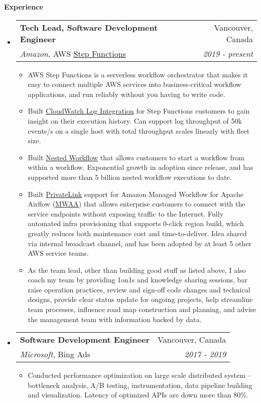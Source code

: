 \documentclass[letterpaper,10pt]{article}
\makeatletter
\newcommand{\resitem}[1]{\item #1 \vspace{-2pt}}
\newcommand{\resheading}[1]{{\large \colorbox{mygrey}{\begin{minipage}{\textwidth}{\textbf{#1 \vphantom{p\^{E}}}}\end{minipage}}}}
\newcommand{\ressubheading}[4]{
\begin{tabular*}{7.0in}{l@{\extracolsep{\fill}}r}
    \textbf{#1} & #2 \\
    #3 & \textit{#4} \\
\end{tabular*}\vspace{-6pt}}
\makeatother
\begin{document}
\resheading{Experience}
\begin{itemize}
\itemsep0em
\item
    \ressubheading{Tech Lead, Software Development Engineer}{Vancouver, Canada}{\textit{Amazon}, AWS \href{https://aws.amazon.com/step-functions/}{Step Functions}}{2019 - present}
    \begin{itemize}
        \resitem{AWS Step Functions is a serverless workflow orchestrator that makes it easy to connect multiple AWS services into business-critical workflow applications, and run reliably without you having to write code. }
        \resitem{Built \href{https://docs.aws.amazon.com/step-functions/latest/dg/cw-logs.html}{CloudWatch Log Integration} for Step Functions customers to gain insight on their execution history. Can support log throughput of 50k events/s on a single host with total throughput scales linearly with fleet size. }
        \resitem{Built \href{https://aws.amazon.com/about-aws/whats-new/2019/08/aws-step-function-adds-support-for-nested-workflows/}{Nested Workflow} that allows customers to start a workflow from within a workflow. Exponential growth in adoption since release, and has supported more than 5 billion nested workflow executions to date. }
        \resitem{Built \href{https://aws.amazon.com/privatelink/}{PrivateLink} support for Amazon Managed Workflow for Apache Airflow (\href{https://docs.aws.amazon.com/mwaa/index.html}{MWAA}) that allows enterprise customers to connect with the service endpoints without exposing traffic to the Internet. Fully automated infra provisioning that supports 0-click region build, which greatly reduces both maintenance cost and time-to-deliver. Idea shared via internal broadcast channel, and has been adopted by at least 5 other AWS service teams. }
        \resitem{As the team lead, other than building good stuff as listed above, I also coach my team by providing 1on1s and knowledge sharing sessions, bar raise operation practices, review and sign-off code changes and technical designs, provide clear status update for ongoing projects, help streamline team processes, influence road map construction and planning, and advise the management team with information backed by data. }
	\end{itemize}
\item
    \ressubheading{Software Development Engineer}{Vancouver, Canada}{\textit{Microsoft}, Bing Ads}{2017 - 2019}
    \begin{itemize}
        \resitem{Conducted performance optimization on large scale distributed system -- bottleneck analysis, A/B testing, instrumentation, data pipeline building and visualization. Latency of optimized APIs are down more than 80\%. }

\end{itemize}
\end{itemize}
\end{document}
